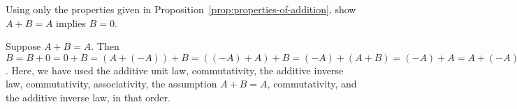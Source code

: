 \begin{ex} Using only the properties given in
  Proposition~\ref{prop:properties-of-addition}, show $A+B=A$ implies $B=0$.
  \begin{sol}
    Suppose $A+B=A$. Then $B=B+0=0+B=(A+(-A))+B = ((-A)+A)+B =
    (-A)+(A+B) = (-A)+A = A+(-A) = 0$. Here, we have used the additive
    unit law, commutativity, the additive inverse law, commutativity,
    associativity, the assumption $A+B=A$, commutativity, and the
    additive inverse law, in that order.
  \end{sol}
\end{ex}

